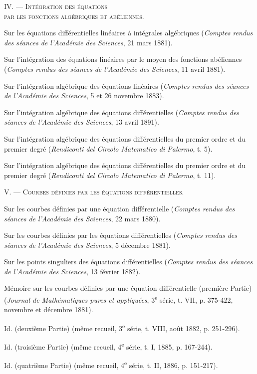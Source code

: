 \documentclass[11pt]{article}
\begin{document}
\begin{center}
{\scshape IV. — Intégration des équations}\\
{\scshape par les fonctions algébriques et abéliennes.}
\end{center}

\begin{description}[leftmargin=3.4em,labelwidth=2.8em,style=nextline]
\item[7.] Sur les équations différentielles linéaires à intégrales algébriques (\emph{Comptes rendus des séances de l’Académie des Sciences}, 21 mars 1881).
\item[10.] Sur l’intégration des équations linéaires par le moyen des fonctions abéliennes (\emph{Comptes rendus des séances de l’Académie des Sciences}, 11 avril 1881).
\item[40.] Sur l’intégration algébrique des équations linéaires (\emph{Comptes rendus des séances de l’Académie des Sciences}, 5 et 26 novembre 1883).
\item[124.] Sur l’intégration algébrique des équations différentielles (\emph{Comptes rendus des séances de l’Académie des Sciences}, 13 avril 1891).
\item[219.] Sur l’intégration algébrique des équations différentielles du premier ordre et du premier degré (\emph{Rendiconti del Circolo Matematico di Palermo}, t. 5).
\item[221.] Sur l’intégration algébrique des équations différentielles du premier ordre et du premier degré (\emph{Rendiconti del Circolo Matematico di Palermo}, t. 11).
\end{description}

\begin{center}
{\scshape V. — Courbes définies par les équations différentielles.}
\end{center}

\begin{description}[leftmargin=3.4em,labelwidth=2.8em,style=nextline]
\item[3.] Sur les courbes définies par une équation différentielle (\emph{Comptes rendus des séances de l’Académie des Sciences}, 22 mars 1880).
\item[20.] Sur les courbes définies par les équations différentielles (\emph{Comptes rendus des séances de l’Académie des Sciences}, 5 décembre 1881).
\item[23.] Sur les points singuliers des équations différentielles (\emph{Comptes rendus des séances de l’Académie des Sciences}, 13 février 1882).
\item[74.] Mémoire sur les courbes définies par une équation différentielle (première Partie) (\emph{Journal de Mathématiques pures et appliquées}, 3\textsuperscript{e} série, t. VII, p. 375-422, novembre et décembre 1881).
\item[75.] Id. (deuxième Partie) (même recueil, 3\textsuperscript{e} série, t. VIII, août 1882, p. 251-296).
\item[76.] Id. (troisième Partie) (même recueil, 4\textsuperscript{e} série, t. I, 1885, p. 167-244).
\item[77.] Id. (quatrième Partie) (même recueil, 4\textsuperscript{e} série, t. II, 1886, p. 151-217).
\end{description}
\end{document}
